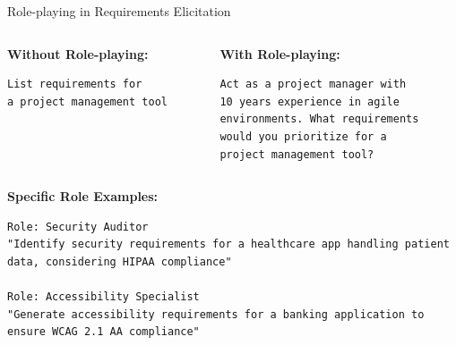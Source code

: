 \documentclass{beamer}
\begin{document}
\begin{frame}[fragile]{Role-playing in Requirements Elicitation}
    \begin{columns}
        \begin{column}{0.5\textwidth}
            \textbf{Without Role-playing:}
            \begin{lstlisting}[style=code]
List requirements for 
a project management tool
            \end{lstlisting}
        \end{column}
        \begin{column}{0.5\textwidth}
            \textbf{With Role-playing:}
            \begin{lstlisting}[style=code]
Act as a project manager with 
10 years experience in agile 
environments. What requirements 
would you prioritize for a 
project management tool?
            \end{lstlisting}
        \end{column}
    \end{columns}
    
    \vspace{0.5cm}
    \textbf{Specific Role Examples:}
    
    \begin{lstlisting}[style=code]
Role: Security Auditor
"Identify security requirements for a healthcare app handling patient data, considering HIPAA compliance"

Role: Accessibility Specialist  
"Generate accessibility requirements for a banking application to ensure WCAG 2.1 AA compliance"
    \end{lstlisting}
\end{frame}
\end{document}
